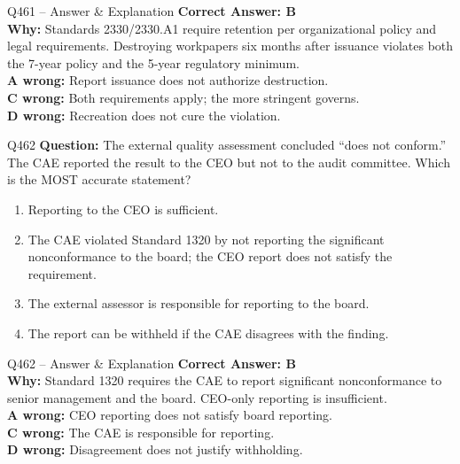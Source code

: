 \documentclass[aspectratio=169,10pt]{beamer}
\begin{document}
	\begin{frame}[t]{Q461 -- Answer \& Explanation}
		\small
		\textbf{Correct Answer: B} \\[4pt]
		\textbf{Why:} Standards 2330/2330.A1 require retention per organizational policy and legal requirements. Destroying workpapers six months after issuance violates both the 7-year policy and the 5-year regulatory minimum. \\[4pt]
		\textbf{A wrong:} Report issuance does not authorize destruction. \\[2pt]
		\textbf{C wrong:} Both requirements apply; the more stringent governs. \\[2pt]
		\textbf{D wrong:} Recreation does not cure the violation.
	\end{frame}
	
	\begin{frame}[t]{Q462}
		\small
		\textbf{Question:} The external quality assessment concluded ``does not conform.'' The CAE reported the result to the CEO but not to the audit committee. Which is the MOST accurate statement?
		\begin{enumerate}[label=\Alph*.,itemsep=1pt,topsep=2pt]
			\item Reporting to the CEO is sufficient.
			\item The CAE violated Standard 1320 by not reporting the significant nonconformance to the board; the CEO report does not satisfy the requirement.
			\item The external assessor is responsible for reporting to the board.
			\item The report can be withheld if the CAE disagrees with the finding.
		\end{enumerate}
	\end{frame}
	
	\begin{frame}[t]{Q462 -- Answer \& Explanation}
		\small
		\textbf{Correct Answer: B} \\[4pt]
		\textbf{Why:} Standard 1320 requires the CAE to report significant nonconformance to senior management and the board. CEO-only reporting is insufficient. \\[4pt]
		\textbf{A wrong:} CEO reporting does not satisfy board reporting. \\[2pt]
		\textbf{C wrong:} The CAE is responsible for reporting. \\[2pt]
		\textbf{D wrong:} Disagreement does not justify withholding.
	\end{frame}
	
\end{document}
